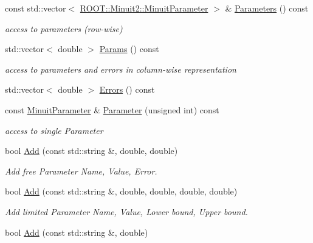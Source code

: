 \begin{DoxyCompactItemize}
\item 
const std\+::vector$<$ \mbox{\hyperlink{classROOT_1_1Minuit2_1_1MinuitParameter}{R\+O\+O\+T\+::\+Minuit2\+::\+Minuit\+Parameter}} $>$ \& \mbox{\hyperlink{classROOT_1_1Minuit2_1_1MnUserParameters_a0ca783762d29fc6e9fa2c7b162f044f4}{Parameters}} () const
\begin{DoxyCompactList}\small\item\em access to parameters (row-\/wise) \end{DoxyCompactList}\item 
std\+::vector$<$ double $>$ \mbox{\hyperlink{classROOT_1_1Minuit2_1_1MnUserParameters_a68a7baf5aa9548c8dd90142327b27218}{Params}} () const
\begin{DoxyCompactList}\small\item\em access to parameters and errors in column-\/wise representation \end{DoxyCompactList}\item 
std\+::vector$<$ double $>$ \mbox{\hyperlink{classROOT_1_1Minuit2_1_1MnUserParameters_abcc81c5cff7f9af0d10e2622c5d715c7}{Errors}} () const
\item 
const \mbox{\hyperlink{classROOT_1_1Minuit2_1_1MinuitParameter}{Minuit\+Parameter}} \& \mbox{\hyperlink{classROOT_1_1Minuit2_1_1MnUserParameters_a13bfc3bb154a2e8974fb20e9524b96da}{Parameter}} (unsigned int) const
\begin{DoxyCompactList}\small\item\em access to single Parameter \end{DoxyCompactList}\item 
bool \mbox{\hyperlink{classROOT_1_1Minuit2_1_1MnUserParameters_a95405d43b783605dba2ead1ba3125ebc}{Add}} (const std\+::string \&, double, double)
\begin{DoxyCompactList}\small\item\em Add free Parameter Name, Value, Error. \end{DoxyCompactList}\item 
bool \mbox{\hyperlink{classROOT_1_1Minuit2_1_1MnUserParameters_ab5e82031e879bf6937975b884784c126}{Add}} (const std\+::string \&, double, double, double, double)
\begin{DoxyCompactList}\small\item\em Add limited Parameter Name, Value, Lower bound, Upper bound. \end{DoxyCompactList}\item 
bool \mbox{\hyperlink{classROOT_1_1Minuit2_1_1MnUserParameters_acb750b2b34d2a7a233f559d6820bbb35}{Add}} (const std\+::string \&, double)

\end{DoxyCompactItemize}
